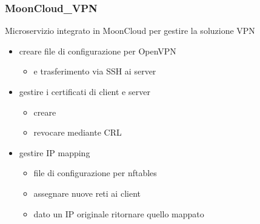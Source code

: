 \begin{frame}
    \frametitle{MoonCloud\_VPN}
    \alert{Microservizio} integrato in MoonCloud per gestire la soluzione VPN
    \begin{itemize}
        \item creare file di \alert{configurazione} per \alert{OpenVPN}
        \begin{itemize}
            \item e \alert{trasferimento} via SSH ai server
        \end{itemize}
        \item gestire i \alert{certificati} di client e server
        \begin{itemize}
            \item creare
            \item revocare mediante \alert{CRL}
        \end{itemize}
        \item gestire \alert{IP mapping}
        \begin{itemize}
            \item file di \alert{configurazione} per \alert{nftables}
            \item assegnare nuove reti ai client
            \item dato un IP originale ritornare quello mappato
        \end{itemize}
    \end{itemize}
\end{frame}


